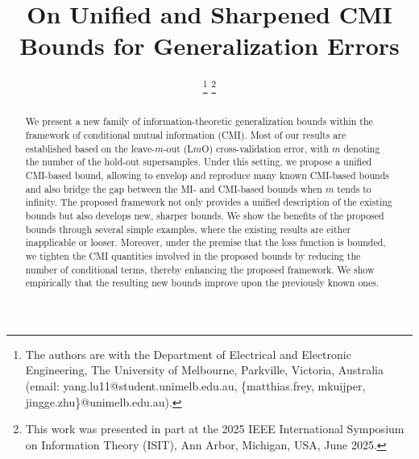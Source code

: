 \documentclass[onecolumn,romanappendices,10pt]{IEEEtran}
\begin{document}
	
	\title{On Unified and Sharpened CMI Bounds for Generalization Errors}
	\author{
		\thanks{The authors are with the Department of Electrical and Electronic Engineering, The University of Melbourne,  Parkville, Victoria, Australia (email: yang.lu11@student.unimelb.edu.au, \{matthias.frey, mkuijper, jingge.zhu\}@unimelb.edu.au).}
		\thanks{This work was presented in part at the 2025 IEEE International Symposium on Information Theory (ISIT), Ann Arbor, Michigan, USA, June 2025.}}
	
	\maketitle
	\begin{abstract} 
		We present a new family of information-theoretic generalization bounds within the framework of conditional mutual information (CMI). Most of our results are established based on the leave-$m$-out (L$m$O) cross-validation error, with $m$ denoting the number of the hold-out supersamples. Under this setting, we propose a unified CMI-based bound, allowing to envelop and reproduce many known CMI-based bounds and also bridge the gap between the MI- and CMI-based bounds when $m$ tends to infinity. The proposed framework not only provides a unified description of the existing bounds but also develops new, sharper bounds. We show the benefits of the proposed bounds through several simple examples, where the existing results are either inapplicable or looser. Moreover, under the premise that the loss function is bounded, we tighten the CMI quantities involved in the proposed bounds by reducing the number of conditional terms, thereby enhancing the proposed framework. We show empirically that the resulting new bounds improve upon the previously known ones.
	\end{abstract}
	
\end{document}
